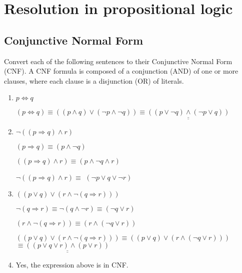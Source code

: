 \section{Resolution in propositional logic}
\subsection{Conjunctive Normal Form}
\begin{large}
    Convert each of the following sentences to their Conjunctive Normal Form (CNF).
    A CNF formula is composed of a conjunction (AND) of one or more clauses, where each clause is a disjunction (OR) of literals.
    \begin{enumerate}
        \item $ p \iff q $

              $ (p \iff q) \equiv ((p \land q) \lor (\neg p \land \neg q)) \equiv \underline{\underline{((p \lor \neg q) \land (\neg p \lor q))}}$

        \item $ \neg ((p \Rightarrow q) \land r) $

              $ (p \Rightarrow q ) \equiv  (p \land \neg q) $

              $ (( p \Rightarrow q) \land r) \equiv  (p \land \neg q \land r) $

              $ \neg ((p \Rightarrow q) \land r) \equiv $ \underline{\underline{$(\neg p \lor q \lor \neg r)$}}

        \item $ ((p \lor q) \lor (r \land \neg(q \Rightarrow r))) $

              $\neg(q \Rightarrow r) \equiv \neg(q \land \neg r) \equiv (\neg q \lor r)$

              $ (r \land \neg(q \Rightarrow r)) \equiv (r \land (\neg q \lor r)) $

              $ ((p \lor q) \lor (r \land \neg(q \Rightarrow r))) \equiv ((p \lor q) \lor (r \land (\neg q \lor r))) $
              $\equiv \underline{\underline{((p \lor q \lor r) \land (p \lor r))}} $

        \item Yes, the expression above is in CNF\@.
    \end{enumerate}
\end{large}


